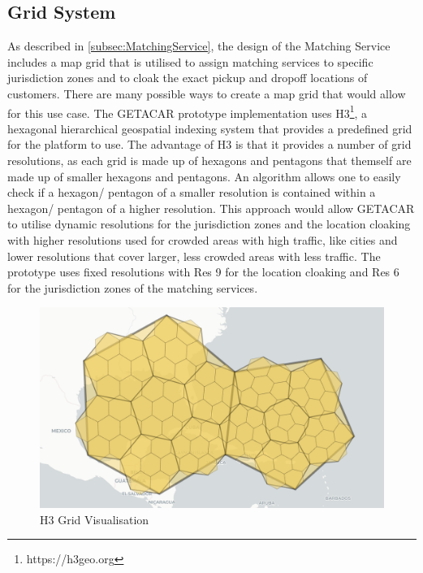 \subsection{Grid System}
As described in \ref{subsec:MatchingService}, the design of the Matching Service includes a map grid that is utilised to assign matching services to specific jurisdiction zones and to cloak the exact pickup and dropoff locations of customers. There are many possible ways to create a map grid that would allow for this use case. The GETACAR prototype implementation uses H3\footnote{https://h3geo.org}, a hexagonal hierarchical geospatial indexing system that provides a predefined grid for the platform to use. The advantage of H3 is that it provides a number of grid resolutions, as each grid is made up of hexagons and pentagons that themself are made up of smaller hexagons and pentagons. An algorithm allows one to easily check if a hexagon/ pentagon of a smaller resolution is contained within a hexagon/ pentagon of a higher resolution. This approach would allow GETACAR to utilise dynamic resolutions for the  jurisdiction zones and the location cloaking with higher resolutions used for crowded areas with high traffic, like cities and lower resolutions that cover larger, less crowded  areas with less traffic. The prototype uses fixed resolutions with Res 9 for the location cloaking and Res 6 for the  jurisdiction zones of the matching services. 

\begin{figure}[h]
    \centering
    \includegraphics[width=\linewidth]{data/11.png}
    \caption{H3 Grid Visualisation ~\cite{H3Geo.}}
    \label{fig:H3Visualisation}
\end{figure}

